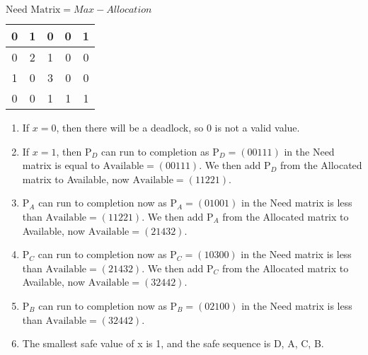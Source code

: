 	$\text{Need Matrix} = Max - Allocation$\par
	\begin{tabular}{|c|c|c|c|c|}
		\hline
		0 & 1 & 0 & 0 & 1\\
		\hline
		0 & 2 & 1 & 0 & 0\\
		\hline
		1 & 0 & 3 & 0 & 0\\
		\hline
		0 & 0 & 1 & 1 & 1\\
		\hline
	\end{tabular}\par
	\begin{enumerate}
		\item If $x=0$, then there will be a deadlock, so 0 is not a valid value.
		\item If $x=1$, then P$_D$ can run to completion as P$_D=(00111)$ in the Need matrix is equal to $\text{Available}=(00111)$. We then add P$_D$ from the Allocated matrix to Available, now $\text{Available} = (11221)$.
		\item P$_A$ can run to completion now as P$_A=(01001)$ in the Need matrix is less than $\text{Available}=(11221)$. We then add P$_A$ from the Allocated matrix to Available, now $\text{Available}=(21432)$.
		\item P$_C$ can run to completion now as P$_C=(10300)$ in the Need matrix is less than $\text{Available}=(21432)$. We then add P$_C$ from the Allocated matrix to Available, now $\text{Available}=(32442)$.
		\item P$_B$ can run to completion now as P$_B=(02100)$ in the Need matrix is less than $\text{Available}=(32442)$.
		\item The smallest safe value of x is 1, and the safe sequence is D, A, C, B.
	\end{enumerate}
	


